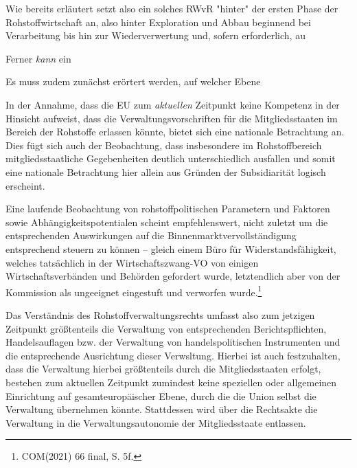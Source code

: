 \documentclass[12pt,a4paper,oneside]{book} %
\begin{document}
Wie bereits erläutert setzt also ein solches RWvR "hinter" der ersten Phase der Rohstoffwirtschaft an, also hinter Exploration und Abbau beginnend bei Verarbeitung bis hin zur Wiederverwertung und, sofern erforderlich, au

Ferner \textit{kann} ein 

Es muss zudem zunächst erörtert werden, auf welcher Ebene

In der Annahme, dass die EU zum \textit{aktuellen} Zeitpunkt keine Kompetenz in der Hinsicht aufweist, dass die Verwaltungsvorschriften für die Mitgliedsstaaten im Bereich der Rohstoffe erlassen könnte, bietet sich eine nationale Betrachtung an. Dies fügt sich auch der Beobachtung, dass insbesondere im Rohstoffbereich mitgliedsstaatliche Gegebenheiten deutlich unterschiedlich ausfallen und somit eine nationale Betrachtung hier allein aus Gründen der Subsidiarität logisch erscheint.

Eine laufende Beobachtung von rohstoffpolitischen Parametern und Faktoren sowie Abhängigkeitspotentialen scheint empfehlenswert, nicht zuletzt um die entsprechenden Auswirkungen auf die Binnenmarktvervollständigung entsprechend steuern zu können -- gleich einem \glqq Büro für Widerstandsfähigkeit\grqq, welches tatsächlich in der Wirtschaftszwang-VO von einigen Wirtschaftsverbänden und Behörden gefordert wurde, letztendlich aber von der Kommission als ungeeignet eingestuft und verworfen wurde.\footnote{COM(2021) 66 final, S. 5f.}

Das Verständnis des Rohstoffverwaltungsrechts umfasst also zum jetzigen Zeitpunkt größtenteils die Verwaltung von entsprechenden Berichtspflichten, Handelsauflagen bzw. der Verwaltung von handelspolitischen Instrumenten und die entsprechende Ausrichtung dieser Verwsltung. Hierbei ist auch festzuhalten, dass die Verwaltung hierbei größtenteils durch die Mitgliedsstaaten erfolgt, bestehen zum aktuellen Zeitpunkt zumindest keine speziellen oder allgemeinen Einrichtung auf gesamteuropäischer Ebene, durch die die Union selbst die Verwaltung übernehmen könnte. Stattdessen wird über die Rechtsakte die Verwaltung in die Verwaltungsautonomie der Mitgliedsstaate entlassen.

\end{document}
